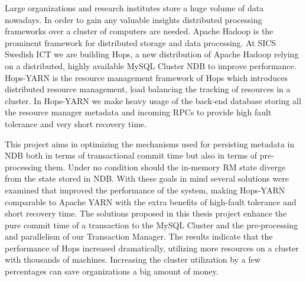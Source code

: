 Large organizations and research institutes store a huge volume of data nowadays.
In order to gain any valuable insights distributed processing frameworks over a
cluster of computers are needed. Apache Hadoop is the prominent framework for distributed
storage and data processing. At SICS Swedish ICT we are building Hops, a new distribution
of Apache Hadoop relying on a distributed, highly available MySQL
Cluster NDB to improve performance. Hops-YARN is the resource management framework of Hops
which introduces distributed resource management, load balancing the
tracking of resources in a cluster. In Hops-YARN we make heavy usage of the
back-end database storing all the resource manager metadata and
incoming RPCs to provide high fault tolerance and very short recovery
time.

This project aims in optimizing the mechanisms used for persisting
metadata in NDB both in terms of transactional commit time but also
in terms of pre-processing them. Under no condition should the in-memory RM
state diverge from the state stored in NDB. With these goals in mind
several solutions were examined that improved the performance of the
system, making Hops-YARN comparable to Apache YARN with the extra benefits
of high-fault tolerance and short recovery time. The solutions
proposed in this thesis project enhance the pure commit time of a
transaction to the MySQL Cluster and the pre-processing and parallelism
of our Transaction Manager. The results indicate that the performance
of Hops increased dramatically, utilizing more resources on a cluster
with thousands of machines. Increasing the cluster utilization by a
few percentages can save organizations a big amount of money.
